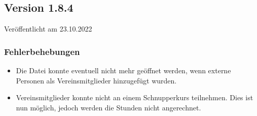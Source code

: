 \begin{neu}
\subsection{Version 1.8.4}
\label{version:1:8:4}
Veröffentlicht am 23.10.2022
\subsubsection{Fehlerbehebungen}
\begin{itemize}
  \item
  Die Datei konnte eventuell nicht mehr geöffnet werden,
  wenn externe Personen als Vereinsmitglieder hinzugefügt wurden.
  \item
  Vereinsmitglieder konnte nicht an einem Schnupperkurs teilnehmen.
  Dies ist nun möglich, jedoch werden die Stunden nicht angerechnet.
\end{itemize}
\end{neu}
